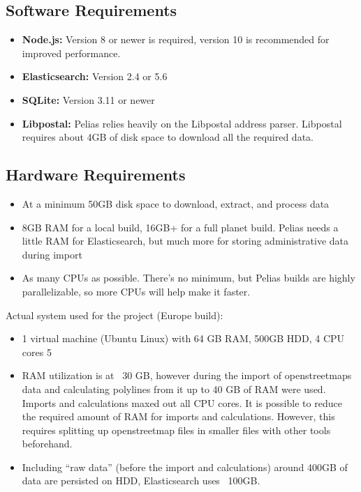 \subsection{Software Requirements}
\begin{itemize}
\item \textbf{Node.js:} Version 8 or newer is required, version 10 is recommended for improved performance.
\item \textbf{Elasticsearch:} Version 2.4 or 5.6
\item \textbf{SQLite:} Version 3.11 or newer
\item \textbf{Libpostal:} Pelias relies heavily on the Libpostal address parser. Libpostal requires about 4GB of disk space to download all the required data.
\end{itemize}

\subsection{Hardware Requirements}
\begin{itemize}
\item At a minimum 50GB disk space to download, extract, and process data
\item 8GB RAM for a local build, 16GB+ for a full planet build. Pelias needs a little RAM for Elasticsearch, but much more for storing administrative data during import
\item As many CPUs as possible. There's no minimum, but Pelias builds are highly parallelizable, so more CPUs will help make it faster.
\end{itemize}

Actual system used for the project (Europe build):
\begin{itemize}
\item 1 virtual machine (Ubuntu Linux) with 64 GB RAM, 500GB HDD, 4 CPU cores
5
\item RAM utilization is at ~30 GB, however during the import of openstreetmaps data and calculating polylines from it up to 40 GB of RAM were used. Imports and calculations maxed out all CPU cores. It is possible to reduce the required amount of RAM for imports and calculations. However, this requires splitting up openstreetmap files in smaller files with other tools beforehand.
\item Including “raw data” (before the import and calculations) around 400GB of data are persisted on HDD, Elasticsearch uses ~100GB.
\end{itemize}
